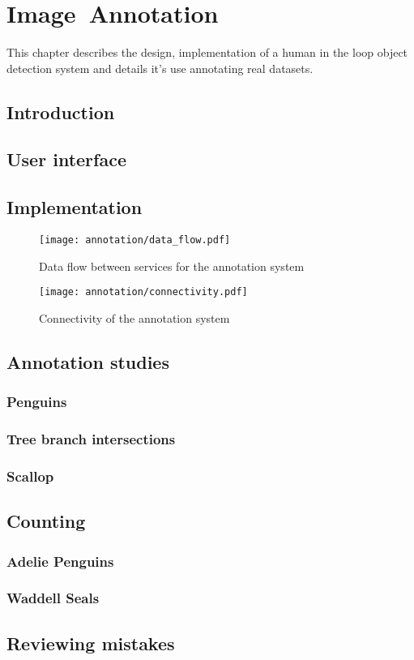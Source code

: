 \chapter{Image~Annotation}
\label{chap:annotation} 

This chapter describes the design, implementation of a human in the loop object detection system and details it's use annotating real datasets.

\section{Introduction}

\section {User interface}


\section {Implementation}

\begin{figure}[h]
  \centering
  \texttt{[image: annotation/data\_flow.pdf]}
  \caption{Data flow between services for the annotation system}  
  \label{fig:data_flow}
\end{figure}


\begin{figure}[h]
  \centering
  \texttt{[image: annotation/connectivity.pdf]}
  \caption{Connectivity of the annotation system}  
  \label{fig:connectivity}
\end{figure}

\section{Annotation studies}

\subsection {Penguins}
\subsection{Tree branch intersections}
\subsection{Scallop}


\section{Counting}

\subsection{Adelie Penguins}
\subsection{Waddell Seals}




\section {Reviewing mistakes}
